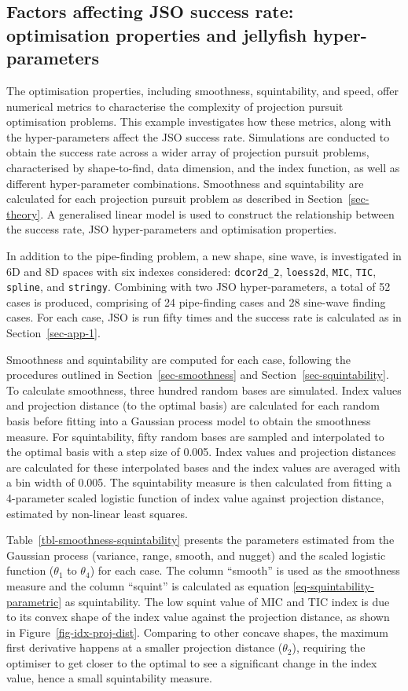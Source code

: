 \documentclass[
  number,
  preprint,
  3p]{elsarticle}
\begin{document}
\subsection{Factors affecting JSO success rate: optimisation properties
and jellyfish hyper-parameters}\label{sec-app-2}

The optimisation properties, including smoothness, squintability, and
speed, offer numerical metrics to characterise the complexity of
projection pursuit optimisation problems. This example investigates how
these metrics, along with the hyper-parameters affect the JSO success
rate. Simulations are conducted to obtain the success rate across a
wider array of projection pursuit problems, characterised by
shape-to-find, data dimension, and the index function, as well as
different hyper-parameter combinations. Smoothness and squintability are
calculated for each projection pursuit problem as described in
Section~\ref{sec-theory}. A generalised linear model is used to
construct the relationship between the success rate, JSO
hyper-parameters and optimisation properties.

In addition to the pipe-finding problem, a new shape, sine wave, is
investigated in 6D and 8D spaces with six indexes considered:
\texttt{dcor2d\_2}, \texttt{loess2d}, \texttt{MIC}, \texttt{TIC},
\texttt{spline}, and \texttt{stringy}. Combining with two JSO
hyper-parameters, a total of 52 cases is produced, comprising of 24
pipe-finding cases and 28 sine-wave finding cases. For each case, JSO is
run fifty times and the success rate is calculated as in
Section~\ref{sec-app-1}.

Smoothness and squintability are computed for each case, following the
procedures outlined in Section~\ref{sec-smoothness} and
Section~\ref{sec-squintability}. To calculate smoothness, three hundred
random bases are simulated. Index values and projection distance (to the
optimal basis) are calculated for each random basis before fitting into
a Gaussian process model to obtain the smoothness measure. For
squintability, fifty random bases are sampled and interpolated to the
optimal basis with a step size of 0.005. Index values and projection
distances are calculated for these interpolated bases and the index
values are averaged with a bin width of 0.005. The squintability measure
is then calculated from fitting a 4-parameter scaled logistic function
of index value against projection distance, estimated by non-linear
least squares.

Table~\ref{tbl-smoothness-squintability} presents the parameters
estimated from the Gaussian process (variance, range, smooth, and
nugget) and the scaled logistic function (\(\theta_1\) to \(\theta_4\))
for each case. The column ``smooth'' is used as the smoothness measure
and the column ``squint'' is calculated as equation
\ref{eq-squintability-parametric} as squintability. The low squint value
of MIC and TIC index is due to its convex shape of the index value
against the projection distance, as shown in
Figure~\ref{fig-idx-proj-dist}. Comparing to other concave shapes, the
maximum first derivative happens at a smaller projection distance
(\(\theta_2\)), requiring the optimiser to get closer to the optimal to
see a significant change in the index value, hence a small squintability
measure.
\end{document}
